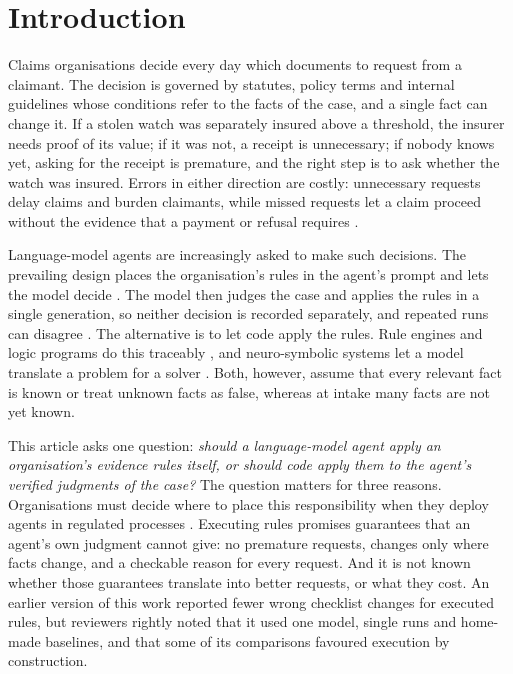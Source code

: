 \section{Introduction}
\label{sec:intro}

Claims organisations decide every day which documents to request from a claimant. The decision is governed by statutes, policy terms and internal guidelines whose conditions refer to the facts of the case, and a single fact can change it. If a stolen watch was separately insured above a threshold, the insurer needs proof of its value; if it was not, a receipt is unnecessary; if nobody knows yet, asking for the receipt is premature, and the right step is to ask whether the watch was insured. Errors in either direction are costly: unnecessary requests delay claims and burden claimants, while missed requests let a claim proceed without the evidence that a payment or refusal requires \cite{eling2022impact}.

Language-model agents are increasingly asked to make such decisions. The prevailing design places the organisation's rules in the agent's prompt and lets the model decide \cite{yao2025taubench,xiao2024flowbench}. The model then judges the case and applies the rules in a single generation, so neither decision is recorded separately, and repeated runs can disagree \cite{atil2025nondeterminism,blairstanek2025unstable}. The alternative is to let code apply the rules. Rule engines and logic programs do this traceably \cite{sergot1986british,merigoux2021catala,omg2024dmn}, and neuro-symbolic systems let a model translate a problem for a solver \cite{pan2023logic,olausson2023linc}. Both, however, assume that every relevant fact is known or treat unknown facts as false, whereas at intake many facts are not yet known.

This article asks one question: \emph{should a language-model agent apply an organisation's evidence rules itself, or should code apply them to the agent's verified judgments of the case?} The question matters for three reasons. Organisations must decide where to place this responsibility when they deploy agents in regulated processes \cite{dumas2023aiaugmented,hevner2023research}. Executing rules promises guarantees that an agent's own judgment cannot give: no premature requests, changes only where facts change, and a checkable reason for every request. And it is not known whether those guarantees translate into better requests, or what they cost. An earlier version of this work reported fewer wrong checklist changes for executed rules, but reviewers rightly noted that it used one model, single runs and home-made baselines, and that some of its comparisons favoured execution by construction.

